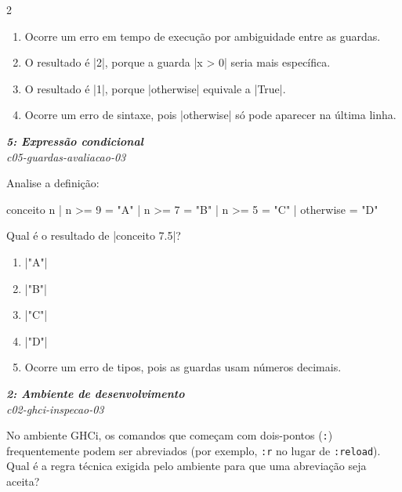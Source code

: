 \documentclass[a4paper,10pt,brazil]{article}
\begin{document}
\begin{multicols}{2}
\begin{enumerate}
  \item Ocorre um erro em tempo de execução por ambiguidade entre as guardas.

  \item O resultado é \haskellinline|2|, porque a guarda \haskellinline|x > 0| seria mais específica.

  \item O resultado é \haskellinline|1|, porque \haskellinline|otherwise| equivale a \haskellinline|True|.

  \item Ocorre um erro de sintaxe, pois \haskellinline|otherwise| só pode aparecer na última linha.


\end{enumerate}

\begin{flushright}
  \footnotesize
  \textit{\textbf{5: Expressão condicional}}\\
  \textit{c05-guardas-avaliacao-03}\\

\end{flushright}
Analise a definição:
\begin{haskellcode}
conceito n
  | n >= 9    = "A"
  | n >= 7    = "B"
  | n >= 5    = "C"
  | otherwise = "D"
\end{haskellcode}
Qual é o resultado de \haskellinline|conceito 7.5|?

\begin{enumerate}
  \item \haskellinline|"A"|

  \item \haskellinline|"B"|

  \item \haskellinline|"C"|

  \item \haskellinline|"D"|

  \item Ocorre um erro de tipos, pois as guardas usam números decimais.


\end{enumerate}

\begin{flushright}
  \footnotesize
  \textit{\textbf{2: Ambiente de desenvolvimento}}\\
  \textit{c02-ghci-inspecao-03}\\

\end{flushright}
No ambiente GHCi, os comandos que começam com dois-pontos (\texttt{:}) frequentemente podem ser abreviados (por exemplo, \texttt{:r} no lugar de \texttt{:reload}). Qual é a regra técnica exigida pelo ambiente para que uma abreviação seja aceita?


\end{multicols}
\end{document}
